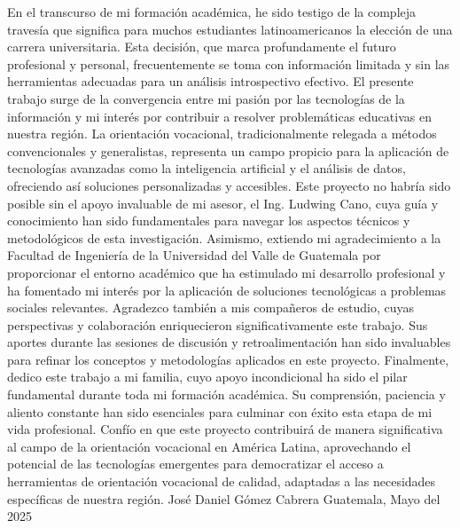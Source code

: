 En el transcurso de mi formación académica, he sido testigo de la compleja travesía que significa para muchos estudiantes latinoamericanos la elección de una carrera universitaria. Esta decisión, que marca profundamente el futuro profesional y personal, frecuentemente se toma con información limitada y sin las herramientas adecuadas para un análisis introspectivo efectivo.
El presente trabajo surge de la convergencia entre mi pasión por las tecnologías de la información y mi interés por contribuir a resolver problemáticas educativas en nuestra región. La orientación vocacional, tradicionalmente relegada a métodos convencionales y generalistas, representa un campo propicio para la aplicación de tecnologías avanzadas como la inteligencia artificial y el análisis de datos, ofreciendo así soluciones personalizadas y accesibles.
Este proyecto no habría sido posible sin el apoyo invaluable de mi asesor, el Ing. Ludwing Cano, cuya guía y conocimiento han sido fundamentales para navegar los aspectos técnicos y metodológicos de esta investigación. Asimismo, extiendo mi agradecimiento a la Facultad de Ingeniería de la Universidad del Valle de Guatemala por proporcionar el entorno académico que ha estimulado mi desarrollo profesional y ha fomentado mi interés por la aplicación de soluciones tecnológicas a problemas sociales relevantes.
Agradezco también a mis compañeros de estudio, cuyas perspectivas y colaboración enriquecieron significativamente este trabajo. Sus aportes durante las sesiones de discusión y retroalimentación han sido invaluables para refinar los conceptos y metodologías aplicados en este proyecto.
Finalmente, dedico este trabajo a mi familia, cuyo apoyo incondicional ha sido el pilar fundamental durante toda mi formación académica. Su comprensión, paciencia y aliento constante han sido esenciales para culminar con éxito esta etapa de mi vida profesional.
Confío en que este proyecto contribuirá de manera significativa al campo de la orientación vocacional en América Latina, aprovechando el potencial de las tecnologías emergentes para democratizar el acceso a herramientas de orientación vocacional de calidad, adaptadas a las necesidades específicas de nuestra región.
\newline
\newline
José Daniel Gómez Cabrera
\newline
\newline
Guatemala, Mayo del 2025